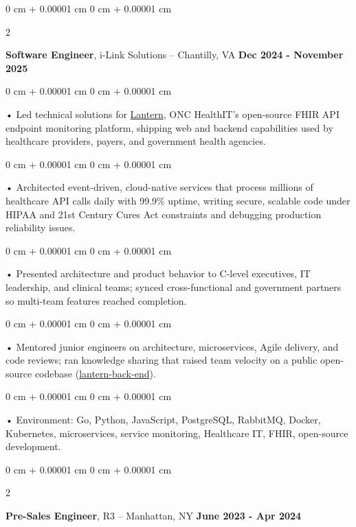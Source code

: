 \documentclass[10pt, letterpaper]{article}
\newenvironment{onecolentry}{
    \begin{adjustwidth}{
        0 cm + 0.00001 cm
    }{
        0 cm + 0.00001 cm
    }
}{
    \end{adjustwidth}
} %
\newenvironment{twocolentry}[2][]{
    \onecolentry
    \def\secondColumn{#2}
    \setcolumnwidth{\fill, 4.5 cm}
    \begin{paracol}{2}
}{
    \switchcolumn \raggedleft \secondColumn
    \end{paracol}
    \endonecolentry
} %
\begin{document}
        \vspace{0.1cm}

        \begin{twocolentry}{
            \textbf{Dec 2024 - November 2025}
        }
            \textbf{Software Engineer}, i-Link Solutions -- Chantilly, VA\end{twocolentry}


        \begin{onecolentry}
             • Led technical solutions for \href{https://lantern.healthit.gov/?tab=dashboard_tab}{Lantern}, ONC HealthIT's open-source FHIR API endpoint monitoring platform, shipping web and backend capabilities used by healthcare providers, payers, and government health agencies.
        \end{onecolentry}
        \begin{onecolentry}
             • Architected event-driven, cloud-native services that process millions of healthcare API calls daily with 99.9\% uptime, writing secure, scalable code under HIPAA and 21st Century Cures Act constraints and debugging production reliability issues.
        \end{onecolentry}
        \begin{onecolentry}
             • Presented architecture and product behavior to C-level executives, IT leadership, and clinical teams; synced cross-functional and government partners so multi-team features reached completion.
        \end{onecolentry}
        \begin{onecolentry}
             • Mentored junior engineers on architecture, microservices, Agile delivery, and code reviews; ran knowledge sharing that raised team velocity on a public open-source codebase (\href{https://github.com/onc-healthit/lantern-back-end}{lantern-back-end}).
        \end{onecolentry}
        \begin{onecolentry}
             • Environment: Go, Python, JavaScript, PostgreSQL, RabbitMQ, Docker, Kubernetes, microservices, service monitoring, Healthcare IT, FHIR, open-source development.
        \end{onecolentry}
        \vspace{0.1cm}

        \begin{twocolentry}{
            \textbf{June 2023 - Apr 2024}
        }
            \textbf{Pre-Sales Engineer}, R3 -- Manhattan, NY\end{twocolentry}
\end{document}
